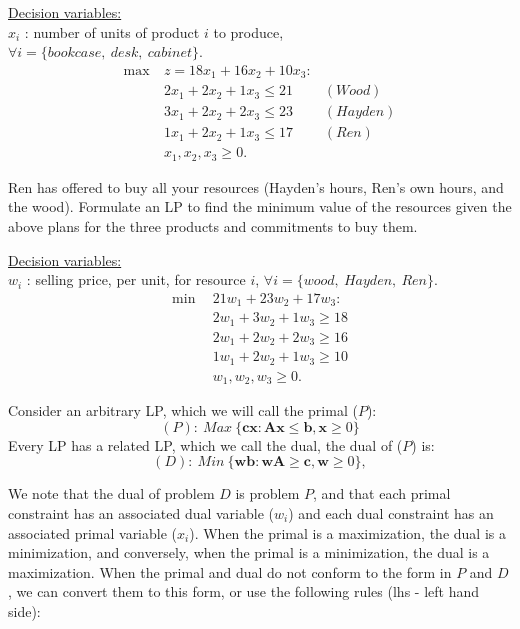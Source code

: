 \medskip \underline{Decision variables:} \\
$x_i$ : number of units of product $i$ to produce, \\
$\forall i = \{bookcase,~desk,~cabinet\}$.
\begin{align*}
\max~& z = 18x_1 + 16x_2 + 10x_3 :  \\
& 2x_1 + 2x_2 + 1x_3 \le 21 & (Wood) \\
& 3x_1 + 2x_2 + 2x_3 \le 23 & (Hayden) \\
&  1x_1 + 2x_2 + 1x_3 \le 17 & (Ren)  \\
& x_1, x_2, x_3 \ge 0.
\end{align*}

Ren has offered to buy all your resources (Hayden's hours, Ren's own hours, and the wood).  Formulate an LP to find the minimum value of the resources given the above plans for the three products and commitments to buy them.

\medskip \underline{Decision variables:} \\
$w_i$ : selling price, per unit, for resource $i$, $\forall i = \{wood,~Hayden,~Ren\}$.
\begin{align*}
\min~~& 21w_1 +23w_2 +17w_3:  \\
&  2w_1 +3w_2 + 1w_3 \ge 18  \\
& 2w_1 +2w_2 + 2w_3 \ge 16 \\
& 1w_1 +2w_2 + 1w_3 \ge 10 \\
& w_1, w_2, w_3 \ge 0. 
\end{align*}

Consider an arbitrary LP, which we will call the primal ($P$):
$$(P):~Max~\{\mathbf{cx}: \mathbf{Ax} \le \mathbf{b}, \mathbf{x} \ge 0\}$$
Every LP has a related LP, which we call the dual, the dual of ($P$) is:
$$(D):~Min~\{\mathbf{wb}: \mathbf{wA} \ge \mathbf{c}, \mathbf{w} \ge 0\},$$

We note that the dual of problem $D$ is problem $P$, and that each primal constraint has an associated dual variable ($w_i$) and each dual constraint has an associated primal variable ($x_i$).   When the primal is a maximization, the dual is a minimization, and conversely, when the primal is a minimization, the dual is a maximization.  When the primal and dual do not conform to the form in $P$ and $D$, we can convert them to this form, or use the following rules (lhs - left hand side): 

